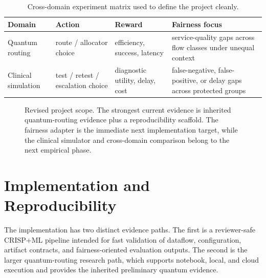 \documentclass[conference]{IEEEtran}
\begin{document}
\begin{table}[t]
\caption{Cross-domain experiment matrix used to define the project cleanly.}
\label{tab:experiment_matrix}
\centering
\small
\begin{tabular}{p{}p{}p{}p{}}
\toprule
\textbf{Domain} & \textbf{Action} & \textbf{Reward} & \textbf{Fairness focus} \\
\midrule
Quantum routing & route / allocator choice & efficiency, success, latency & service-quality gaps across flow classes under unequal context \\
Clinical simulation & test / retest / escalation choice & diagnostic utility, delay, cost & false-negative, false-positive, or delay gaps across protected groups \\
\bottomrule
\end{tabular}
\end{table}

\begin{figure}[t]
\centering
{}
\caption{Revised project scope. The strongest current evidence is inherited quantum-routing evidence plus a reproducibility scaffold. The fairness adapter is the immediate next implementation target, while the clinical simulator and cross-domain comparison belong to the next empirical phase.}
\label{fig:scope}
\end{figure}

\section{Implementation and Reproducibility}
The implementation has two distinct evidence paths. The first is a reviewer-safe CRISP+ML pipeline intended for fast validation of dataflow, configuration, artifact contracts, and fairness-oriented evaluation outputs. The second is the larger quantum-routing research path, which supports notebook, local, and cloud execution and provides the inherited preliminary quantum evidence.
\end{document}

